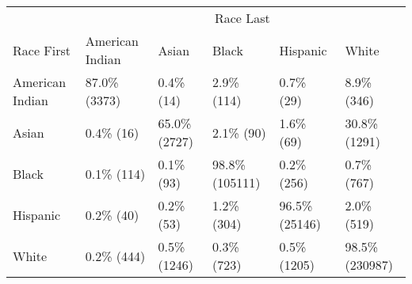 \begin{table}[H]
\centering\begingroup\fontsize{9}{11}\selectfont

\begin{tabular}{llllll}
\toprule
\multicolumn{1}{c}{} & \multicolumn{5}{c}{Race Last} \\
\cmidrule(l{3pt}r{3pt}){2-6}
Race First & American Indian & Asian & Black & Hispanic & White\\
\midrule
American Indian & 87.0\% (3373) & 0.4\%   (14) & 2.9\%    (114) & 0.7\%    (29) & 8.9\%    (346)\\
Asian & 0.4\%   (16) & 65.0\% (2727) & 2.1\%     (90) & 1.6\%    (69) & 30.8\%   (1291)\\
Black & 0.1\%  (114) & 0.1\%   (93) & 98.8\% (105111) & 0.2\%   (256) & 0.7\%    (767)\\
Hispanic & 0.2\%   (40) & 0.2\%   (53) & 1.2\%    (304) & 96.5\% (25146) & 2.0\%    (519)\\
White & 0.2\%  (444) & 0.5\% (1246) & 0.3\%    (723) & 0.5\%  (1205) & 98.5\% (230987)\\
\bottomrule
\end{tabular}
\endgroup{}
\end{table}
